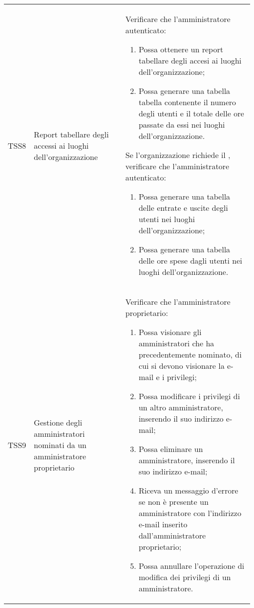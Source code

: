 {\begin{longtable}{ c  C{3cm}  C{11cm} }
TSS8 & Report tabellare degli accessi ai luoghi dell'organizzazione &
Verificare che l'amministratore autenticato:
\begin{enumerate}
    \item Possa ottenere un report tabellare degli accesi ai luoghi dell'organizzazione;
    \item Possa generare una tabella tabella contenente il numero degli utenti e il totale delle ore passate da essi nei luoghi dell’organizzazione.
\end{enumerate}
Se l'organizzazione richiede il , verificare che l'amministratore autenticato:
\begin{enumerate}[resume]
    \item Possa generare una tabella delle entrate e uscite degli utenti nei luoghi dell'organizzazione;
    \item Possa generare una tabella delle ore spese dagli utenti nei luoghi dell'organizzazione.
\end{enumerate} \\

TSS9 & Gestione degli amministratori nominati da un amministratore proprietario & 
Verificare che l'amministratore proprietario:
\begin{enumerate}
    \item Possa visionare gli amministratori che ha precedentemente nominato, di cui si devono visionare la e-mail e i privilegi;
    \item Possa modificare i privilegi di un altro amministratore, inserendo il suo indirizzo e-mail;
    \item Possa eliminare un amministratore, inserendo il suo indirizzo e-mail; 
    \item Riceva un messaggio d'errore se non è presente un amministratore con l'indirizzo e-mail inserito dall'amministratore proprietario;
    \item Possa annullare l'operazione di modifica dei privilegi di un amministratore.
\end{enumerate} \\


\end{longtable}}
